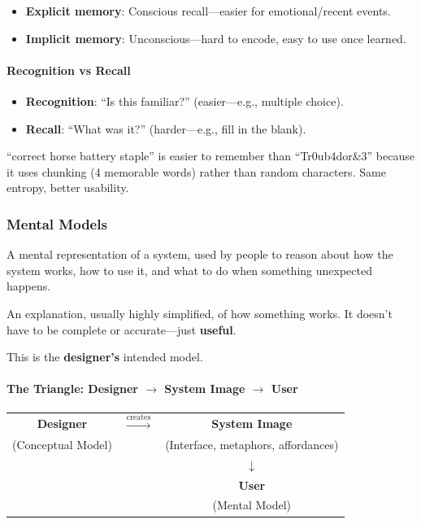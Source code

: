 \begin{itemize}
  \item \textbf{Explicit memory}: Conscious recall---easier for emotional/recent events.
  \item \textbf{Implicit memory}: Unconscious---hard to encode, easy to use once learned.
\end{itemize}

\paragraph*{Recognition vs Recall}
\begin{itemize}
  \item \textbf{Recognition}: ``Is this familiar?'' (easier---e.g., multiple choice).
  \item \textbf{Recall}: ``What was it?'' (harder---e.g., fill in the blank).
\end{itemize}

\begin{tipbox}
``correct horse battery staple'' is easier to remember than ``Tr0ub4dor\&3'' because it uses chunking (4 memorable words) rather than random characters. Same entropy, better usability.
\end{tipbox}

\subsubsection*{Mental Models}

\begin{defbox}
A mental representation of a system, used by people to reason about how the system works, how to use it, and what to do when something unexpected happens.
\end{defbox}

\begin{defbox}
An explanation, usually highly simplified, of how something works. It doesn't have to be complete or accurate---just \textbf{useful}.

This is the \textbf{designer's} intended model.
\end{defbox}

\paragraph*{The Triangle: Designer $\to$ System Image $\to$ User}

\begin{center}
\begin{tabular}{@{} c c c @{}}
\textbf{Designer} & $\xrightarrow{\text{creates}}$ & \textbf{System Image} \\
(Conceptual Model) & & (Interface, metaphors, affordances) \\
& & $\downarrow$ \\
& & \textbf{User} \\
& & (Mental Model)
\end{tabular}
\end{center}

